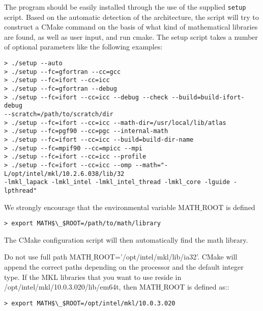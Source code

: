 The program should be easily installed through the use of the supplied
\verb|setup| script. Based on the
automatic detection of the architecture, the
script will try to construct a CMake command on the
basis of what kind of mathematical libraries are found, as well as user input, and run cmake. 
The setup script takes a number of optional parameters like the following examples:
\begin{verbatim}
> ./setup --auto
> ./setup --fc=gfortran --cc=gcc
> ./setup --fc=ifort --cc=icc
> ./setup --fc=gfortran --debug
> ./setup --fc=ifort --cc=icc --debug --check --build=build-ifort-debug 
--scratch=/path/to/scratch/dir
> ./setup --fc=ifort --cc=icc --math-dir=/usr/local/lib/atlas
> ./setup --fc=pgf90 --cc=pgc --internal-math
> ./setup --fc=ifort --cc=icc --build=build-dir-name
> ./setup --fc=mpif90 --cc=mpicc --mpi
> ./setup --fc=ifort --cc=icc --profile
> ./setup --fc=ifort --cc=icc --omp --math="-L/opt/intel/mkl/10.2.6.038/lib/32 
-lmkl_lapack -lmkl_intel -lmkl_intel_thread -lmkl_core -lguide -lpthread"
\end{verbatim}
We strongly encourage that the environmental variable MATH$\_$ROOT is defined
\begin{verbatim}
> export MATH$\_$ROOT=/path/to/math/library
\end{verbatim}
The CMake configuration script will then automatically find the math library. 

Do not use full path MATH$\_$ROOT='/opt/intel/mkl/lib/ia32'. CMake will append the
correct paths depending on the processor and the default integer type.  If the
MKL libraries that you want to use reside in
/opt/intel/mkl/10.0.3.020/lib/em64t, then MATH$\_$ROOT is defined as::
\begin{verbatim}
> export MATH$\_$ROOT=/opt/intel/mkl/10.0.3.020
\end{verbatim}

